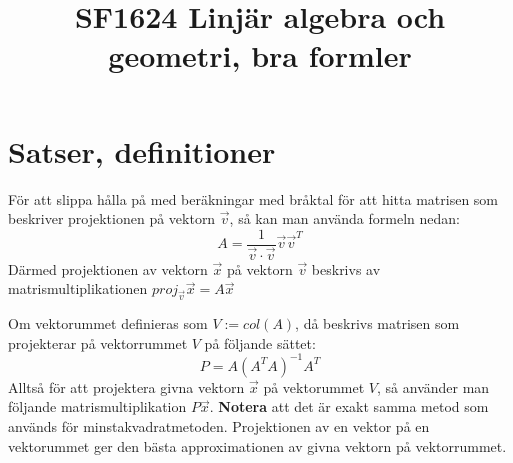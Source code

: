 \documentclass{report}
\title{\Huge{SF1624 Linjär algebra och geometri, bra formler}}
\author{\huge{}}
\date{}
\begin{document}
\maketitle
\newpage
\pagebreak

\chapter{Satser, definitioner}


{
	För att slippa hålla på med beräkningar med bråktal för att hitta matrisen som beskriver projektionen på vektorn $ \vec{v}  $, så kan man använda formeln nedan:
\[
A = \frac{1}{\vec{v} \cdot \vec{v} } \vec{v} \vec{v}^T
\]
Därmed projektionen av vektorn $ \vec{x} $ på vektorn $ \vec{v}  $ beskrivs av matrismultiplikationen $ proj_{ \vec{v} } \vec{x} = A \vec{x}  $  
}

{
Om vektorummet definieras som $ V := col(A) $, då beskrivs matrisen som projekterar på vektorrummet $ V $ på följande sättet:
\[
	P = A (A^T A)^{-1} A^T
\]
Alltså för att projektera givna vektorn $ \vec{x}  $ på vektorummet $ V $, så använder man följande matrismultiplikation $ P \vec{x}  $. \textbf{Notera} att det är exakt samma metod som används för minstakvadratmetoden. Projektionen av en vektor på en vektorummet ger den bästa approximationen av givna vektorn på vektorrummet. 
}

\pagebreak
\end{document}
